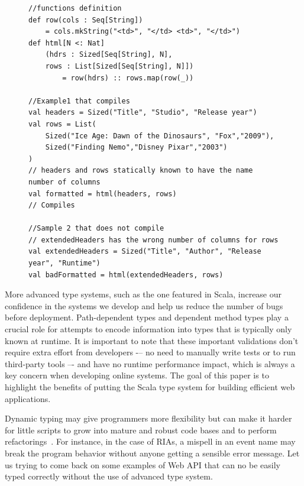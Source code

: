 \documentclass[runningheads,a4paper]{llncs}
\begin{document}
\begin{figure}
\begin{lstlisting}[label=pathdependenttypeexample,caption=Path dependent type example]
//functions definition
def row(cols : Seq[String]) 
	= cols.mkString("<td>", "</td> <td>", "</td>")
def html[N <: Nat]
	(hdrs : Sized[Seq[String], N],
	rows : List[Sized[Seq[String], N]]) 
		= row(hdrs) :: rows.map(row(_))

//Example1 that compiles
val headers = Sized("Title", "Studio", "Release year")
val rows = List(  
	Sized("Ice Age: Dawn of the Dinosaurs", "Fox","2009"),
	Sized("Finding Nemo","Disney Pixar","2003")
)
// headers and rows statically known to have the name number of columns
val formatted = html(headers, rows)                        // Compiles

//Sample 2 that does not compile
// extendedHeaders has the wrong number of columns for rows
val extendedHeaders = Sized("Title", "Author", "Release year", "Runtime")
val badFormatted = html(extendedHeaders, rows)          
\end{lstlisting}
\end{figure}

More advanced type systems, such as the one featured in Scala, increase our confidence in the
systems we develop and help us reduce the number of bugs before deployment. Path-dependent types and
dependent method types play a crucial role for attempts to encode information into types that is
typically only known at runtime. It is important to note that these important validations don't
require extra effort from developers -– no need to manually write tests or to run third-party tools
–- and have no runtime performance impact, which is always a key concern when developing online
systems. The goal of this paper is to highlight the benefits of putting the Scala type system for
building efficient web applications.


% 
Dynamic typing may give programmers more flexibility but can make it harder for little scripts to grow into mature
and robust code bases and to perform refactorings~\cite{Meijer04_StaticDynamic}. For instance, in the case of RIAs, a
mispell in an event name may break the program behavior without anyone getting a sensible error message. Let us trying to come back on some examples of Web API that can no be easily typed correctly without the use of advanced type system.


\end{document}
